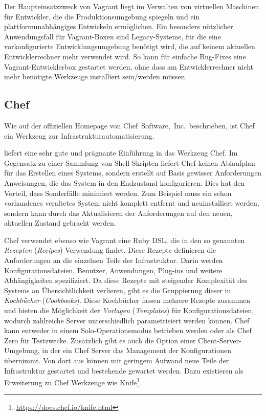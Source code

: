 Der Haupteinsatzzweck von Vagrant liegt im Verwalten von virtuellen Maschinen für Entwickler, die die Produktionsumgebung spiegeln und ein plattformunabhängiges Entwickeln ermöglichen.
Ein besonders nützlicher Anwendungsfall für Vagrant-Boxen sind Legacy-Systeme, für die eine vorkonfigurierte Entwicklungsumgebung benötigt wird, die auf keinem aktuellen Entwicklerrechner mehr verwendet wird.
So kann für einfache Bug-Fixes eine Vagrant-Entwicklerbox gestartet werden, ohne dass am Entwicklerrechner nicht mehr benötigte Werkzeuge installiert sein/werden müssen.


\subsection{Chef}
\label{sub:chef}
Wie auf der offiziellen Homepage \autocite{Chef:online} von Chef~Software,~Inc.\ beschrieben, ist Chef ein Werkzeug zur Infrastrukturautomatisierung.

\autocite{Wolff201604} liefert eine sehr gute und prägnante Einführung in das Werkzeug Chef.
Im Gegensatz zu einer Sammlung von Shell-Skripten liefert Chef keinen Ablaufplan für das Erstellen eines Systems, sondern erstellt auf Basis gewisser Anforderungen Anweisungen, die das System in den Endzustand konfigurieren.
Dies hat den Vorteil, dass Sonderfälle minimiert werden. Zum Beispiel muss ein schon vorhandenes veraltetes System nicht komplett entfernt und neuinstalliert werden, sondern kann durch das Aktualisieren der Anforderungen auf den neuen, aktuellen Zustand gebracht werden.

Chef verwendet ebenso wie Vagrant eine Ruby DSL, die in den so genannten \emph{Rezepten} (\emph{Recipes}) Verwendung findet.
Diese Rezepte definieren die Anforderungen an die einzelnen Teile der Infrastruktur. Darin werden Konfigurationsdateien, Benutzer, Anwendungen, Plug-ins und weitere Abhängigkeiten spezifiziert.
Da diese Rezepte mit steigender Komplexität des Systems an Übersichtlichkeit verlieren, gibt es die Gruppierung dieser in \emph{Kochbücher} (\emph{Cookbooks}).
Diese Kochbücher fassen mehrere Rezepte zusammen und bieten die Möglichkeit der \emph{Vorlagen} (\emph{Templates}) für Konfigurationsdateien, wodurch zahlreiche Server unterschiedlich parametrisiert werden können.
Chef kann entweder in einem Solo-Operationsmodus betrieben werden oder als Chef Zero für Testzwecke. Zusätzlich gibt es auch die Option einer Client-Server-Umgebung, in der ein Chef Server das Management der Konfigurationen übernimmt.
Von dort aus können mit geringem Aufwand neue Teile der Infrastruktur gestartet und bestehende gewartet werden. Dazu existieren als Erweiterung zu Chef Werkzeuge wie Knife\footnote{\url{https://docs.chef.io/knife.html}}.

